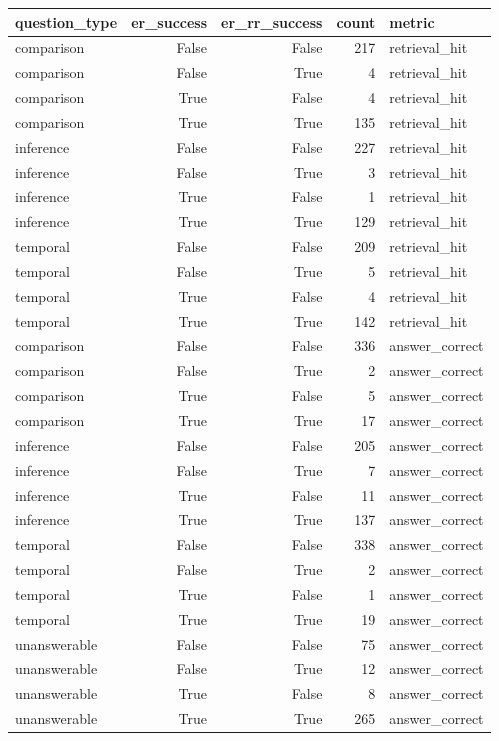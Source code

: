 \begin{tabular}{lrrrl}
\toprule
question_type & er_success & er_rr_success & count & metric \\
\midrule
comparison & False & False & 217 & retrieval_hit \\
comparison & False & True & 4 & retrieval_hit \\
comparison & True & False & 4 & retrieval_hit \\
comparison & True & True & 135 & retrieval_hit \\
inference & False & False & 227 & retrieval_hit \\
inference & False & True & 3 & retrieval_hit \\
inference & True & False & 1 & retrieval_hit \\
inference & True & True & 129 & retrieval_hit \\
temporal & False & False & 209 & retrieval_hit \\
temporal & False & True & 5 & retrieval_hit \\
temporal & True & False & 4 & retrieval_hit \\
temporal & True & True & 142 & retrieval_hit \\
comparison & False & False & 336 & answer_correct \\
comparison & False & True & 2 & answer_correct \\
comparison & True & False & 5 & answer_correct \\
comparison & True & True & 17 & answer_correct \\
inference & False & False & 205 & answer_correct \\
inference & False & True & 7 & answer_correct \\
inference & True & False & 11 & answer_correct \\
inference & True & True & 137 & answer_correct \\
temporal & False & False & 338 & answer_correct \\
temporal & False & True & 2 & answer_correct \\
temporal & True & False & 1 & answer_correct \\
temporal & True & True & 19 & answer_correct \\
unanswerable & False & False & 75 & answer_correct \\
unanswerable & False & True & 12 & answer_correct \\
unanswerable & True & False & 8 & answer_correct \\
unanswerable & True & True & 265 & answer_correct \\
\bottomrule
\end{tabular}
